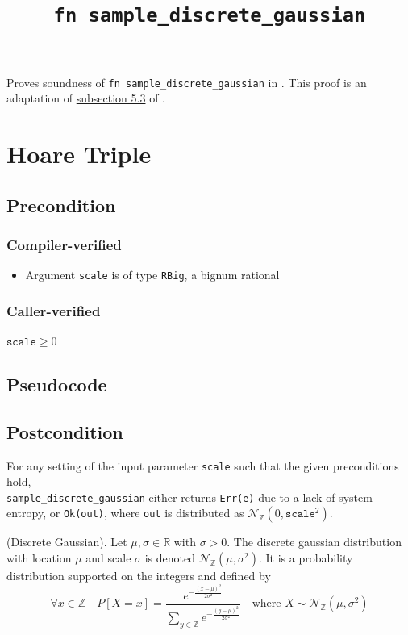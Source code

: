 \documentclass{article}
\title{\texttt{fn sample\_discrete\_gaussian}}
\author{\MichaelShoemateAuthor}
\begin{document}
\maketitle

Proves soundness of \texttt{fn sample\_discrete\_gaussian} in .
This proof is an adaptation of \href{https://arxiv.org/pdf/2004.00010.pdf#subsection.5.3}{subsection 5.3} of \cite{CKS20}.

\section{Hoare Triple}
\subsection*{Precondition}
\subsubsection*{Compiler-verified}
\begin{itemize}
    \item Argument \texttt{scale} is of type \texttt{RBig}, a bignum rational
\end{itemize}

\subsubsection*{Caller-verified}
$\texttt{scale} \geq 0$

\subsection*{Pseudocode}


\subsection*{Postcondition}
\begin{theorem}
    \label{postcondition}
    For any setting of the input parameter \texttt{scale} such that the given preconditions hold, \\
    \texttt{sample\_discrete\_gaussian} either returns \texttt{Err(e)} due to a lack of system entropy,
    or \texttt{Ok(out)}, where \texttt{out} is distributed as $\mathcal{N}_\mathbb{Z}(0, \texttt{scale}^2)$.
\end{theorem}
\begin{definition}
    (Discrete Gaussian). \cite{CKS20} Let $\mu, \sigma \in \mathbb{R}$ with $\sigma > 0$.
    The discrete gaussian distribution with location $\mu$ and scale $\sigma$ is denoted $\mathcal{N}_\mathbb{Z}(\mu, \sigma^2)$.
    It is a probability distribution supported on the integers and defined by
    \begin{equation*}
        \forall x \in \mathbb{Z} \quad  P[X = x] = \frac{e^{-\frac{(x - \mu)^2}{2\sigma^2}}}{\sum_{y\in\mathbb{Z}}e^{-\frac{(y - \mu)^2}{2\sigma^2}}} \quad \text{where } X \sim \mathcal{N}_\mathbb{Z}(\mu, \sigma^2)
    \end{equation*}
\end{definition}
\end{document}
